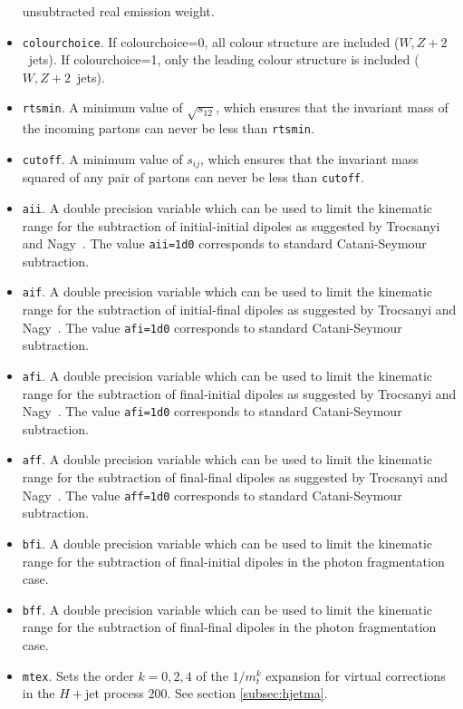 \documentclass{article}
\begin{document}
\begin{itemize}
unsubtracted real emission weight.
\item {\tt colourchoice}.  
If colourchoice=0, all colour structure are included ($W,Z+2$~jets).
If colourchoice=1, only the leading 
colour structure is included ($W,Z+2$~jets).
\item {\tt rtsmin}.  
A minimum value of $\sqrt{s_{12}}$, which ensures that the invariant mass
of the incoming partons can never be less than {\tt rtsmin}.
\item {\tt cutoff}.  
A minimum value of $s_{ij}$, which ensures that the invariant mass squared
of any pair of partons can never be less than {\tt cutoff}.
\item {\tt aii}.  
A double precision variable which can be used to
limit the kinematic range for the subtraction of initial-initial dipoles
as suggested by Trocsanyi and Nagy~\cite{Nagy:2003tz}.   
The value {\tt aii=1d0} corresponds 
to standard Catani-Seymour subtraction.
\item {\tt aif}.  
A double precision variable which can be used to
limit the kinematic range for the subtraction of initial-final dipoles
as suggested by Trocsanyi and Nagy~\cite{Nagy:2003tz}.   
The value {\tt afi=1d0} corresponds 
to standard Catani-Seymour subtraction.
\item {\tt afi}.  
A double precision variable which can be used to
limit the kinematic range for the subtraction of final-initial dipoles
as suggested by Trocsanyi and Nagy~\cite{Nagy:2003tz}.   
The value {\tt afi=1d0} corresponds 
to standard Catani-Seymour subtraction.
\item {\tt aff}. 
A double precision variable which can be used to
limit the kinematic range for the subtraction of final-final dipoles
as suggested by Trocsanyi and Nagy~\cite{Nagy:2003tz}.   
The value {\tt aff=1d0} corresponds 
to standard Catani-Seymour subtraction.
\item {\tt bfi}. 
A double precision variable which can be used to
limit the kinematic range for the subtraction of final-initial dipoles
in the photon fragmentation case.
\item {\tt bff}. 
A double precision variable which can be used to
limit the kinematic range for the subtraction of final-final dipoles
in the photon fragmentation case.
\item {\tt mtex}.
Sets the order $k=0,2,4$ of the $1/m_t^k$ expansion for virtual corrections in the $H+$jet process 200. See 
section \ref{subsec:hjetma}.
\end{itemize}
\end{document}
